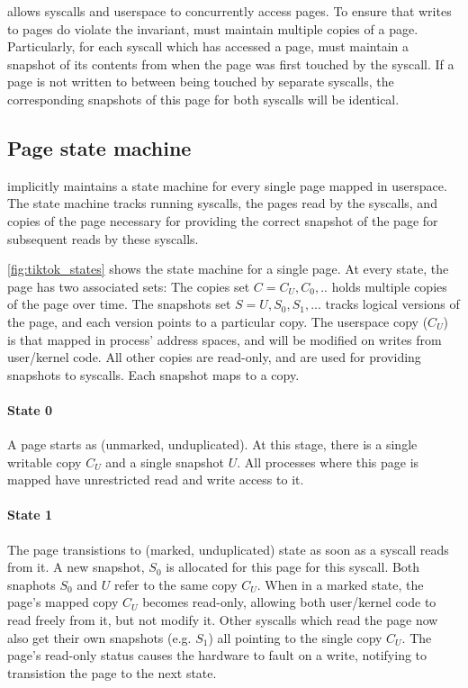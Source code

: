 \documentclass[letterpaper,twocolumn,10pt, anonymous]{article}
\begin{document}
\tiktok allows syscalls and userspace to concurrently access pages.
To ensure that writes to pages do violate the invariant, \tiktok
must maintain multiple copies of a page.
Particularly, for each syscall which has accessed a page, \tiktok
must maintain a snapshot of its contents from when the page was first 
touched by the syscall.
If a page is not written to between being touched by separate syscalls,
the corresponding snapshots of this page for both syscalls will be identical. 

\subsection{Page state machine}

\tiktok implicitly maintains a state machine for every single page mapped in
userspace. 
The state machine tracks running syscalls, the pages read by the syscalls,
and copies of the page necessary for providing the correct snapshot of the
page for subsequent reads by these syscalls.

\autoref{fig:tiktok_states} shows the state machine for a single page.
At every state, the page has two associated sets:
The copies set $C = {C_U, C_0, ..}$ holds multiple copies of the page over time. 
The snapshots set $S = {U, S_0, S_1, ...}$ tracks logical versions of the page, 
and each version points to a particular copy. 
The userspace copy ($C_U$) is that mapped in process' address spaces, and 
will be modified on writes from user/kernel code.
All other copies are read-only, and are used for providing snapshots to syscalls.
Each snapshot maps to a copy.

\paragraph{State 0}
A page starts as (unmarked, unduplicated). 
At this stage, there is a single writable copy $C_U$ and a single snapshot $U$. 
All processes where this page is mapped have unrestricted read and write access
to it.

\paragraph{State 1}
The page transistions to (marked, unduplicated) state as soon as a syscall 
reads from it. 
A new snapshot, $S_0$ is allocated for this page for this syscall.
Both snaphots $S_0$ and $U$ refer to the same copy $C_U$.
When in a marked state, the page's mapped copy $C_U$ becomes read-only,
allowing both user/kernel code to read freely from it, but not modify it.
Other syscalls which read the page now also get their own snapshots 
(e.g. $S_1$) all pointing to the single copy $C_U$.
The page's read-only status causes the hardware to fault on a write,
notifying \tiktok to transistion the page to the next state.
\end{document}
